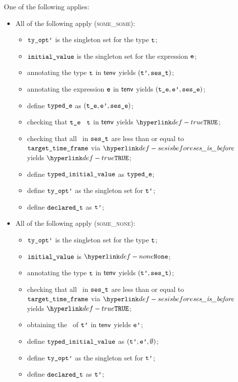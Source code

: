 \ProseParagraph
One of the following applies:
\begin{itemize}
  \item All of the following apply (\textsc{some\_some}):
  \begin{itemize}
    \item $\texttt{ty\_opt'}$ is the singleton set for the type $\texttt{t}$;
    \item $\texttt{initial\_value}$ is the singleton set for the expression $\texttt{e}$;
    \item annotating the type $\texttt{t}$ in $\textsf{tenv}$ yields $(\texttt{t'}, \texttt{ses\_t})$\ProseOrTypeError;
    \item annotating the expression $\texttt{e}$ in $\textsf{tenv}$ yields $(\texttt{t\_e}, \texttt{e'}, \texttt{ses\_e})$\ProseOrTypeError;
    \item define $\texttt{typed\_e}$ as $(\texttt{t\_e}, \texttt{e'}, \texttt{ses\_e})$;
    \item checking that $\texttt{t\_e}$ \typesatisfies\ $\texttt{t}$ in $\textsf{tenv}$ yields $\True$\ProseOrTypeError;
    \item checking that all \timeframesterm\ in $\texttt{ses\_t}$ are less than or equal to \\
          $\texttt{target\_time\_frame}$ via $\sesisbefore$ yields $\True$\ProseOrTypeError;
    \item define $\texttt{typed\_initial\_value}$ as $\texttt{typed\_e}$;
    \item define $\texttt{ty\_opt'}$ as the singleton set for $\texttt{t'}$;
    \item define $\texttt{declared\_t}$ as $\texttt{t'}$;
  \end{itemize}

  \item All of the following apply (\textsc{some\_none}):
  \begin{itemize}
    \item $\texttt{ty\_opt'}$ is the singleton set for the type $\texttt{t}$;
    \item $\texttt{initial\_value}$ is $\None$;
    \item annotating the type $\texttt{t}$ in $\textsf{tenv}$ yields $(\texttt{t'}, \texttt{ses\_t})$\ProseOrTypeError;
    \item checking that all \timeframesterm\ in $\texttt{ses\_t}$ are less than or equal to \\
          $\texttt{target\_time\_frame}$ via $\sesisbefore$ yields $\True$\ProseOrTypeError;
    \item obtaining the \basevalueterm\ of $\texttt{t'}$ in $\textsf{tenv}$ yields $\texttt{e'}$\ProseOrTypeError;
    \item define $\texttt{typed\_initial\_value}$ as $(\texttt{t'}, \texttt{e'}, \emptyset)$;
    \item define $\texttt{ty\_opt'}$ as the singleton set for $\texttt{t'}$;
    \item define $\texttt{declared\_t}$ as $\texttt{t'}$;
  \end{itemize}


\end{itemize}
